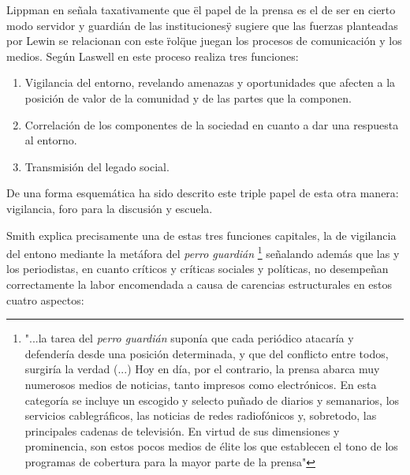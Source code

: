 
Lippman en \cite{lippmann1922public} señala taxativamente que \"el papel de la prensa es el de ser en cierto modo servidor y guardián de las instituciones\" y sugiere que las fuerzas planteadas por Lewin se relacionan con este \"rol\" que juegan los procesos de comunicación y los medios. Según Laswell en \cite{Lasswell2007Structure} este proceso realiza tres funciones: 
\begin{enumerate}
\item Vigilancia del entorno, revelando amenazas y oportunidades que afecten a la posición de valor de la comunidad y de las partes que la componen.
\item Correlación de los componentes de la sociedad en cuanto a dar una respuesta al entorno. 
\item Transmisión del legado social. 
\end{enumerate}
De una forma esquemática ha sido descrito este triple papel de esta otra manera: vigilancia, foro para la discusión y escuela.\cite{informacionsociedad} 

Smith \cite{tedsmith} explica precisamente una de estas tres funciones capitales, la de vigilancia del entono mediante la metáfora del \emph{perro guardián} \footnote{ "...la tarea del \emph{perro guardián} suponía que cada periódico atacaría y defendería desde una posición determinada, y que del conflicto entre todos, surgiría la verdad (...) Hoy en día, por el contrario, la prensa abarca muy numerosos medios de noticias, tanto impresos como electrónicos. En esta categoría se incluye un escogido y selecto puñado de diarios y semanarios, los servicios cablegráficos, las noticias de redes radiofónicos y, sobretodo, las principales cadenas de televisión. En virtud de sus dimensiones y prominencia, son estos pocos medios de élite los que establecen el tono de los programas de cobertura para la mayor parte de la prensa"} señalando además que las y los periodistas, en cuanto críticos y críticas sociales y políticas, no desempeñan correctamente la labor encomendada a causa de carencias estructurales en estos cuatro aspectos: 

